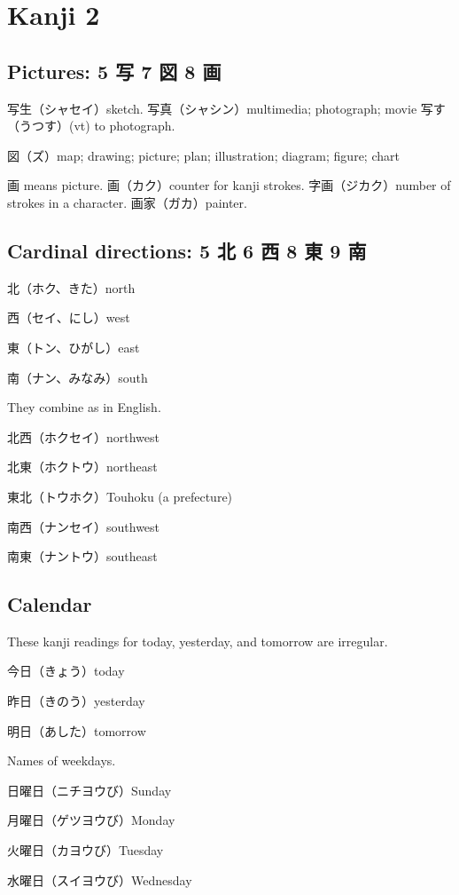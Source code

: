 \chapter{Kanji 2}

\section{Pictures: 5 写 7 図 8 画}

写生（シャセイ）sketch.
写真（シャシン）multimedia; photograph; movie
写す（うつす）(vt) to photograph.

図（ズ）map; drawing; picture; plan; illustration; diagram; figure; chart

画 means picture.
画（カク）counter for kanji strokes.
字画（ジカク）number of strokes in a character.
画家（ガカ）painter.

\section{Cardinal directions: 5 北 6 西 8 東 9 南}

北（ホク、きた）north

西（セイ、にし）west

東（トン、ひがし）east

南（ナン、みなみ）south

They combine as in English.

北西（ホクセイ）northwest

北東（ホクトウ）northeast

東北（トウホク）Touhoku (a prefecture)

南西（ナンセイ）southwest

南東（ナントウ）southeast

\section{Calendar}

These kanji readings for today, yesterday, and tomorrow are irregular.

今日（きょう）today

昨日（きのう）yesterday

明日（あした）tomorrow

Names of weekdays.

日曜日（ニチヨウび）Sunday

月曜日（ゲツヨウび）Monday

火曜日（カヨウび）Tuesday

水曜日（スイヨウび）Wednesday

